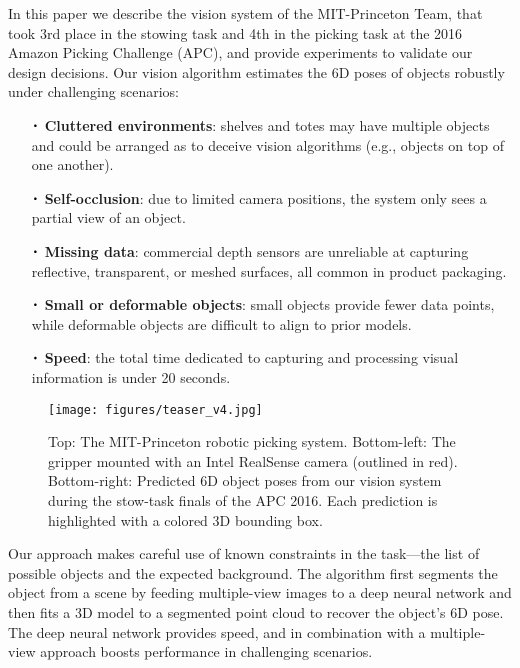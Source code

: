 \documentclass[letterpaper, 10 pt, conference]{ieeeconf}  %
\newcommand*{\Cdot}{\raisebox{-0.25ex}{\scalebox{1.75}{$\cdot$}}}
\begin{document}
In this paper we describe the vision system of the MIT-Princeton Team, that took 3rd place in the stowing task and 4th in the picking task at the 2016 Amazon Picking Challenge (APC), and provide experiments to validate our design decisions. 
%
Our vision algorithm estimates the 6D poses of objects robustly under challenging scenarios:

\begin{itemize}
\item[$\Cdot$] \textbf{Cluttered environments}: shelves and totes may have multiple objects and could be arranged as to deceive vision algorithms (e.g., objects on top of one another).

\item[$\Cdot$] \textbf{Self-occlusion}: due to limited camera positions, the system only sees a partial view of an object.

\item[$\Cdot$] \textbf{Missing data}: commercial depth sensors are unreliable at capturing reflective, transparent, or meshed surfaces, all common in product packaging.

\item[$\Cdot$] \textbf{Small or deformable objects}: small objects provide fewer data points, while deformable objects are difficult to align to prior models.

\item[$\Cdot$] \textbf{Speed}: the total time dedicated to capturing and processing visual information is under 20 seconds.
\end{itemize}

\begin{figure}
\centering
  \texttt{[image: figures/teaser\_v4.jpg]}
  \caption{Top: The MIT-Princeton robotic picking system. Bottom-left: The gripper mounted with an Intel RealSense camera (outlined in red). Bottom-right: Predicted 6D object poses from our vision system during the stow-task finals of the APC 2016. Each prediction is highlighted with a colored 3D bounding box.}
  \label{fig:teaser}
\end{figure}

Our approach makes careful use of known constraints in the task---the list of possible objects and the expected background.
The algorithm first segments the object from a scene by feeding multiple-view images to a deep neural network and then fits a 3D model to a segmented point cloud to recover the object's 6D pose.
The 
deep neural network provides speed, and in combination with a multiple-view approach boosts performance in challenging scenarios.
\end{document}
